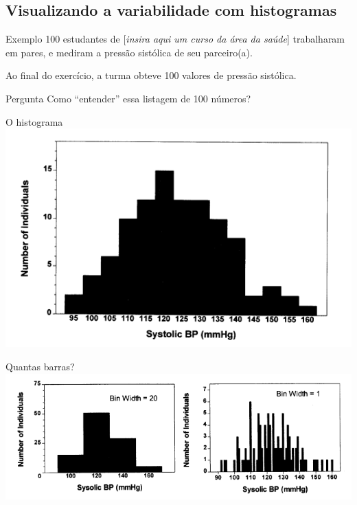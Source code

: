 \documentclass{beamer}
\begin{document}
\subsection{Visualizando a variabilidade com histogramas}

\begin{frame}
  \begin{exampleblock}{Exemplo}
    100 estudantes de [{\em insira aqui um curso da área da saúde}] trabalharam em pares, e mediram a pressão sistólica de seu parceiro(a).

    Ao final do exercício, a turma obteve 100 valores de pressão sistólica.
  \end{exampleblock}
  \begin{block}{Pergunta}
    Como ``entender'' essa listagem de 100 números?
  \end{block}
\end{frame}

\begin{frame}{O histograma}
  \includegraphics[height=\textheight]{Cap3/histograma1}
\end{frame}

\begin{frame}{Quantas barras?}
  \includegraphics[width=\textwidth]{Cap3/histograma2}
\end{frame}
\end{document}
